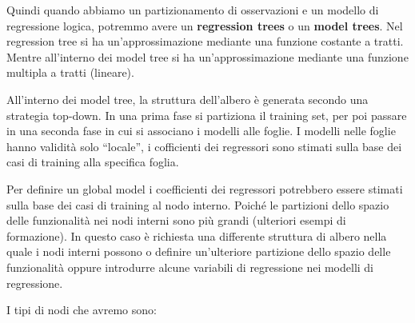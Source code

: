 \documentclass[a4paper]{extarticle}
\begin{document}
Quindi quando abbiamo un partizionamento di osservazioni e un modello di regressione logica, potremmo avere un \textbf{regression trees} o un \textbf{model trees}.   Nel regression tree si ha un'approssimazione mediante una funzione costante a tratti. Mentre all'interno dei model tree si ha un'approssimazione mediante una funzione multipla a tratti (lineare).

All'interno dei model tree, la struttura dell'albero è generata secondo una strategia top-down. In una prima fase si partiziona il training set, per poi passare in una seconda fase in cui si associano i modelli alle foglie. I modelli nelle foglie hanno validità solo “locale”, i cofficienti dei regressori sono stimati sulla base dei casi di training alla specifica foglia.

Per definire un global model i coefficienti dei regressori potrebbero essere stimati sulla base dei casi di training al nodo interno. Poiché le partizioni dello spazio delle funzionalità nei nodi interni sono più grandi (ulteriori esempi di formazione). In questo caso è richiesta una differente struttura di albero nella quale i nodi interni possono o definire un'ulteriore partizione dello spazio delle funzionalità oppure introdurre alcune variabili di regressione nei modelli di regressione.

I tipi di nodi che avremo sono:
\end{document}
